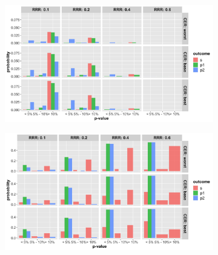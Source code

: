 \documentclass[]{article}
\begin{document}
\begin{figure}
\centering
  \caption{Probability that the p-value (from Fisher’s exact test) at termination of the trial is below 5\%, between 5\%
  and 10\% and greater than 10\% for cases where trial was (a) stopped for futility; (b) stopped for superiority. The
  rows represent the three control even rate scenarios and the three columns present the three relative risk reduction
  scenarios. Note: the denominator in each figure is the number of simulations (not the number of trials stopped for
  futility (a) or superiority (b), and thus, the proportions do not add up to 100\% within one figure. Further, (a) and
  (b) do not include simulations where the trial went to the max. allowed sample size. The bars should be interpreted
  with respect to the relative proportion that fit in each category.}
  \begin{subfigure}{0.8\textwidth}
    \centering
    \caption{}
    \includegraphics{../p1_plots/batch_size_nb_2000/pvalue_fut_p1.png}
  \end{subfigure}
  \bigbreak
  \begin{subfigure}{0.8\textwidth}
    \centering
    \caption{}
    \includegraphics{../p1_plots/batch_size_nb_2000/pvalue_sup_p1.png}
  \end{subfigure}
\end{figure}
\end{document}

